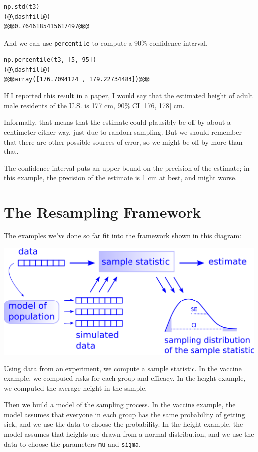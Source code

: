 \begin{lstlisting}[]
np.std(t3)
(@\dashfill@)
@@@0.7646185415617497@@@
\end{lstlisting}

And we can use \passthrough{\lstinline!percentile!} to compute a 90\%
confidence interval.

\begin{lstlisting}[]
np.percentile(t3, [5, 95])
(@\dashfill@)
@@@array([176.7094124 , 179.22734483])@@@
\end{lstlisting}

If I reported this result in a paper, I would say that the estimated
height of adult male residents of the U.S. is 177 cm, 90\% CI {[}176,
178{]} cm.

Informally, that means that the estimate could plausibly be off by about
a centimeter either way, just due to random sampling. But we should
remember that there are other possible sources of error, so we might be
off by more than that.

The confidence interval puts an upper bound on the precision of the
estimate; in this example, the precision of the estimate is 1 cm at
best, and might worse.

\hypertarget{the-resampling-framework}{%
\section{The Resampling Framework}\label{the-resampling-framework}}

The examples we've done so far fit into the framework shown in this
diagram:

\includegraphics{figs/resampling.png}

Using data from an experiment, we compute a sample statistic. In the
vaccine example, we computed risks for each group and efficacy. In the
height example, we computed the average height in the sample.

Then we build a model of the sampling process. In the vaccine example,
the model assumes that everyone in each group has the same probability
of getting sick, and we use the data to choose the probability. In the
height example, the model assumes that heights are drawn from a normal
distribution, and we use the data to choose the parameters
\passthrough{\lstinline!mu!} and \passthrough{\lstinline!sigma!}.

